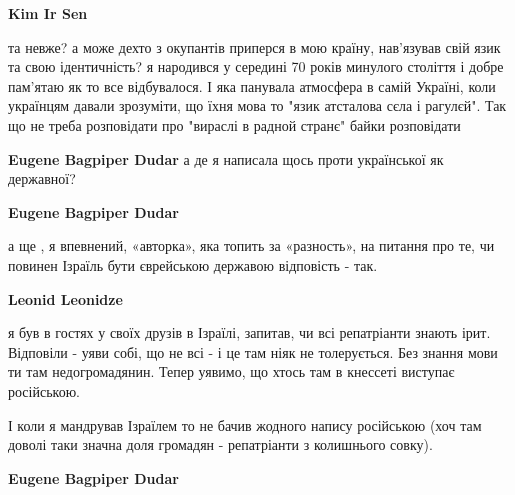 \begin{itemize}
\begin{itemize}
\textbf{Kim Ir Sen} 

та невже? а може дехто з окупантів приперся в мою країну, нав'язував свій язик
та свою ідентичність? я народився у середині 70 років минулого століття і добре
пам'ятаю як то все відбувалося. І яка панувала атмосфера в самій Україні, коли
українцям давали зрозуміти, що їхня мова то "язик атсталова сєла і рагулєй".
Так що не треба розповідати про "вираслі в радной странє" байки розповідати


 
\textbf{Eugene Bagpiper Dudar} а де я написала щось проти української як державної?

 
\textbf{Eugene Bagpiper Dudar} 

а ще , я впевнений, «авторка», яка топить за «разность», на питання про те, чи
повинен Ізраїль бути єврейською державою відповість - так.

 
\textbf{Leonid Leonidze} 

я був в гостях у своїх друзів в Ізраїлі, запитав, чи всі репатріанти знають
ірит. Відповіли - уяви собі, що не всі - і це там ніяк не толерується. Без
знання мови ти там недогромадянин. Тепер уявимо, що хтось там в кнессеті
виступає російською.

І коли я мандрував Ізраїлем то не бачив жодного напису російською (хоч там
доволі таки значна доля громадян - репатріанти з колишнього совку).


 
\textbf{Eugene Bagpiper Dudar} 


\end{itemize}
\end{itemize}
